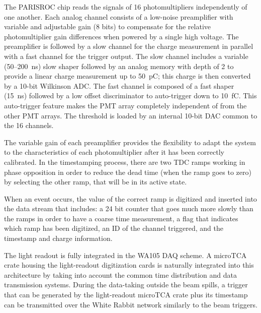 The PARISROC chip reads the signals of 16 photomultipliers  independently of one another. Each analog channel consists of a
low-noise preamplifier with variable and adjustable gain (8 bits) to compensate for the relative photomultiplier gain differences when powered by a
single high voltage. The preamplifier is followed by a slow channel for the charge measurement in parallel with a fast channel for the
trigger output. The slow channel includes a variable (50--200~ns) slow shaper followed by an analog memory with depth of 2 to provide a
linear charge measurement up to 50~pC; this charge is then converted by a 10-bit Wilkinson ADC. The fast channel is composed of a fast
shaper (15~ns) followed by a low offset discriminator to auto-trigger down to 10~fC. This auto-trigger feature makes the PMT array
completely independent of from the other PMT arrays. The threshold is loaded by an internal 10-bit DAC common to the 16 channels.


The variable gain of each preamplifier provides the flexibility to adapt the system to the characteristics of each photomultiplier after it has been correctly calibrated. In  the timestamping process, there are two TDC ramps working in phase opposition in order to reduce  the dead time (when the ramp goes to zero) by selecting the other ramp, that will be in its active state.

 When an event occurs, the value of the correct ramp is digitized and inserted into the data stream that includes: a 24 bit counter that goes much more slowly than the ramps in order to have a coarse time measurement, a flag that indicates which ramp has been digitized, an ID of the channel triggered, and the timestamp and charge information.


The light readout is fully integrated in the WA105 DAQ scheme. A microTCA crate housing the light-readout digitization cards is
naturally integrated into this architecture by taking into account the common time distribution and data transmission systems.  During the
data-taking outside the beam spills, a trigger that can be generated by the light-readout microTCA crate plus its timestamp can be
transmitted over the White Rabbit network similarly to the beam triggers.

